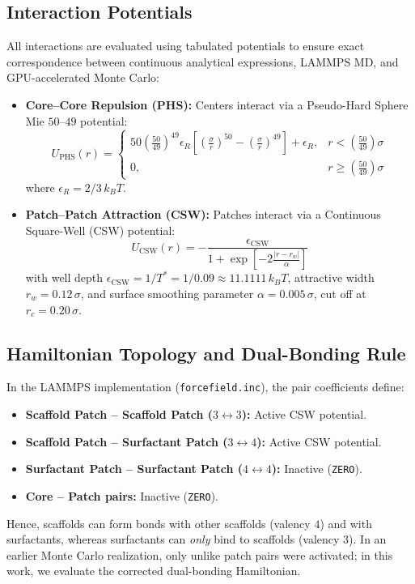 \documentclass[11pt,a4paper]{article}
\begin{document}
\subsection{Interaction Potentials}
All interactions are evaluated using tabulated potentials to ensure exact correspondence between continuous analytical expressions, LAMMPS MD, and GPU-accelerated Monte Carlo:
\begin{itemize}
    \item \textbf{Core--Core Repulsion (PHS):} Centers interact via a Pseudo-Hard Sphere Mie $50$--$49$ potential:
    \begin{equation}
        U_{\text{PHS}}(r) = \begin{cases}
            50 \left(\frac{50}{49}\right)^{49} \epsilon_R \left[\left(\frac{\sigma}{r}\right)^{50} - \left(\frac{\sigma}{r}\right)^{49}\right] + \epsilon_R, & r < \left(\frac{50}{49}\right)\sigma \\
            0, & r \ge \left(\frac{50}{49}\right)\sigma
        \end{cases}
    \end{equation}
    where $\epsilon_R = 2/3\,k_B T$.
    \item \textbf{Patch--Patch Attraction (CSW):} Patches interact via a Continuous Square-Well (CSW) potential:
    \begin{equation}
        U_{\text{CSW}}(r) = -\frac{\epsilon_{\text{CSW}}}{1 + \exp\left[-2\frac{|r - r_w|}{\alpha}\right]}
    \end{equation}
    with well depth $\epsilon_{\text{CSW}} = 1/T^* = 1/0.09 \approx 11.1111\,k_B T$, attractive width $r_w = 0.12\,\sigma$, and surface smoothing parameter $\alpha = 0.005\,\sigma$, cut off at $r_c = 0.20\,\sigma$.
\end{itemize}

\subsection{Hamiltonian Topology and Dual-Bonding Rule}
In the LAMMPS implementation (\texttt{forcefield.inc}), the pair coefficients define:
\begin{itemize}
    \item \textbf{Scaffold Patch -- Scaffold Patch ($3 \leftrightarrow 3$):} Active CSW potential.
    \item \textbf{Scaffold Patch -- Surfactant Patch ($3 \leftrightarrow 4$):} Active CSW potential.
    \item \textbf{Surfactant Patch -- Surfactant Patch ($4 \leftrightarrow 4$):} Inactive (\texttt{ZERO}).
    \item \textbf{Core -- Patch pairs:} Inactive (\texttt{ZERO}).
\end{itemize}
Hence, scaffolds can form bonds with other scaffolds (valency $4$) and with surfactants, whereas surfactants can \textit{only} bind to scaffolds (valency $3$). In an earlier Monte Carlo realization, only unlike patch pairs were activated; in this work, we evaluate the corrected dual-bonding Hamiltonian.
\end{document}
